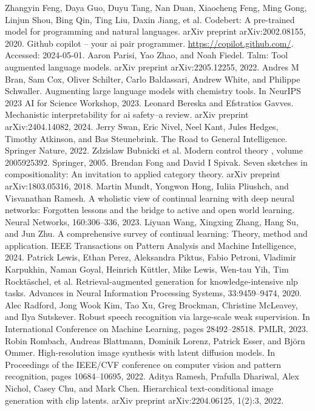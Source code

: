 \begin{chapterreferences}
 Zhangyin Feng, Daya Guo, Duyu Tang, Nan Duan, Xiaocheng Feng, Ming Gong, Linjun Shou, Bing Qin, Ting Liu, Daxin Jiang, et al. Codebert: A pre-trained model for programming and natural languages. arXiv preprint arXiv:2002.08155, 2020.
 Github copilot – your ai pair programmer. \url{https://copilot.github.com/}. Accessed: 2024-05-01.
 Aaron Parisi, Yao Zhao, and Noah Fiedel. Talm: Tool augmented language models. arXiv preprint arXiv:2205.12255, 2022.
 Andres M Bran, Sam Cox, Oliver Schilter, Carlo Baldassari, Andrew White, and Philippe Schwaller. Augmenting large language models with chemistry tools. In NeurIPS 2023 AI for Science Workshop, 2023.
 Leonard Bereska and Efstratios Gavves. Mechanistic interpretability for ai safety–a review. arXiv preprint arXiv:2404.14082, 2024.
 Jerry Swan, Eric Nivel, Neel Kant, Jules Hedges, Timothy Atkinson, and Bas Steunebrink. The Road to General Intelligence. Springer Nature, 2022.
 Zdzislaw Bubnicki et al. Modern control theory , volume 2005925392. Springer, 2005.
 Brendan Fong and David I Spivak. Seven sketches in compositionality: An invitation to applied category theory. arXiv preprint arXiv:1803.05316, 2018.
 Martin Mundt, Yongwon Hong, Iuliia Pliushch, and Visvanathan Ramesh. A wholistic view of continual learning with deep neural networks: Forgotten lessons and the bridge to active and open world learning. Neural Networks, 160:306–336, 2023.
 Liyuan Wang, Xingxing Zhang, Hang Su, and Jun Zhu. A comprehensive survey of continual learning: Theory, method and application. IEEE Transactions on Pattern Analysis and Machine Intelligence, 2024.
 Patrick Lewis, Ethan Perez, Aleksandra Piktus, Fabio Petroni, Vladimir Karpukhin, Naman Goyal, Heinrich Küttler, Mike Lewis, Wen-tau Yih, Tim Rocktäschel, et al. Retrieval-augmented generation for knowledge-intensive nlp tasks. Advances in Neural Information Processing Systems, 33:9459–9474, 2020.
 Alec Radford, Jong Wook Kim, Tao Xu, Greg Brockman, Christine McLeavey, and Ilya Sutskever. Robust speech recognition via large-scale weak supervision. In International Conference on Machine Learning, pages 28492–28518. PMLR, 2023.
 Robin Rombach, Andreas Blattmann, Dominik Lorenz, Patrick Esser, and Björn Ommer. High-resolution image synthesis with latent diffusion models. In Proceedings of the IEEE/CVF conference on computer vision and pattern recognition, pages 10684–10695, 2022.
 Aditya Ramesh, Prafulla Dhariwal, Alex Nichol, Casey Chu, and Mark Chen. Hierarchical text-conditional image generation with clip latents. arXiv preprint arXiv:2204.06125, 1(2):3, 2022.

\end{chapterreferences}
